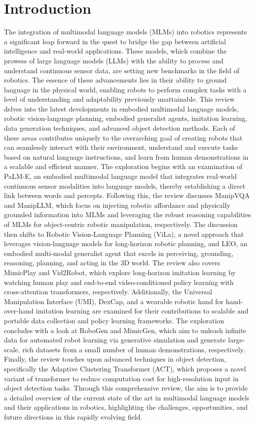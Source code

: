 \documentclass[a4paper]{article}
\begin{document}
\section{Introduction}
The integration of multimodal language models (MLMs) into robotics represents a significant leap forward in the quest to bridge the gap between artificial intelligence and real-world applications. These models, which combine the prowess of large language models (LLMs) with the ability to process and understand continuous sensor data, are setting new benchmarks in the field of robotics. The essence of these advancements lies in their ability to ground language in the physical world, enabling robots to perform complex tasks with a level of understanding and adaptability previously unattainable. This review delves into the latest developments in embodied multimodal language models, robotic vision-language planning, embodied generalist agents, imitation learning, data generation techniques, and advanced object detection methods. Each of these areas contributes uniquely to the overarching goal of creating robots that can seamlessly interact with their environment, understand and execute tasks based on natural language instructions, and learn from human demonstrations in a scalable and efficient manner. The exploration begins with an examination of PaLM-E, an embodied multimodal language model that integrates real-world continuous sensor modalities into language models, thereby establishing a direct link between words and percepts. Following this, the review discusses ManipVQA and ManipLLM, which focus on injecting robotic affordance and physically grounded information into MLMs and leveraging the robust reasoning capabilities of MLMs for object-centric robotic manipulation, respectively. The discussion then shifts to Robotic Vision-Language Planning (ViLa), a novel approach that leverages vision-language models for long-horizon robotic planning, and LEO, an embodied multi-modal generalist agent that excels in perceiving, grounding, reasoning, planning, and acting in the 3D world. The review also covers MimicPlay and Vid2Robot, which explore long-horizon imitation learning by watching human play and end-to-end video-conditioned policy learning with cross-attention transformers, respectively. Additionally, the Universal Manipulation Interface (UMI), DexCap, and a wearable robotic hand for hand-over-hand imitation learning are examined for their contributions to scalable and portable data collection and policy learning frameworks. The exploration concludes with a look at RoboGen and MimicGen, which aim to unleash infinite data for automated robot learning via generative simulation and generate large-scale, rich datasets from a small number of human demonstrations, respectively. Finally, the review touches upon advanced techniques in object detection, specifically the Adaptive Clustering Transformer (ACT), which proposes a novel variant of transformer to reduce computation cost for high-resolution input in object detection tasks. Through this comprehensive review, the aim is to provide a detailed overview of the current state of the art in multimodal language models and their applications in robotics, highlighting the challenges, opportunities, and future directions in this rapidly evolving field.
\end{document}
